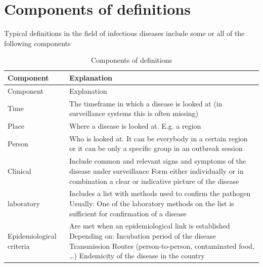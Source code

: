 \documentclass[
  letterpaper,
  DIV=11,
  numbers=noendperiod]{scrreprt}
\begin{document}
\section{Components of definitions}\label{components-of-definitions}

Typical definitions in the field of infectious diseases include some or
all of the following components

\begin{longtable}[]{@{}
  >{\raggedright\arraybackslash}p{}
  >{\raggedright\arraybackslash}p{}@{}}
\caption{Components of definitions}\tabularnewline
\toprule\noalign{}
\begin{minipage}[b]{\linewidth}\raggedright
Component
\end{minipage} & \begin{minipage}[b]{\linewidth}\raggedright
Explanation
\end{minipage} \\
\midrule\noalign{}
\endfirsthead
\toprule\noalign{}
\begin{minipage}[b]{\linewidth}\raggedright
Component
\end{minipage} & \begin{minipage}[b]{\linewidth}\raggedright
Explanation
\end{minipage} \\
\midrule\noalign{}
\endhead
\bottomrule\noalign{}
\endlastfoot
Time & The timeframe in which a disease is looked at (in surveillance
systems this is often missing) \\
Place & Where a disease is looked at. E.g. a region \\
Person & Who is looked at. It can be everybody in a certain region or it
can be only a specific group in an outbreak session \\
Clinical & Include common and relevant signs and symptoms of the disease
under surveillance Form either individually or in combination a clear or
indicative picture of the disease \\
laboratory & Includes a list with methods used to confirm the pathogen
Usually: One of the laboratory methods on the list is sufficient for
confirmation of a disease \\
Epidemiological criteria & Are met when an epidemiological link is
established Depending on: Incubation period of the disease Transmission
Routes (person-to-person, contaminated food, \ldots) Endemicity of the
disease in the country \\
\end{longtable}
\end{document}
